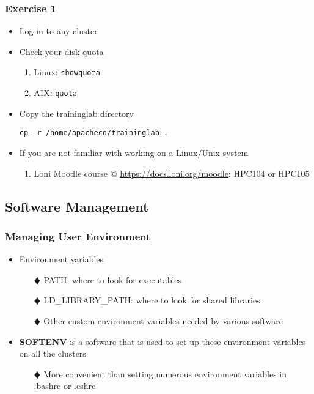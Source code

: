 \documentclass[slidestop,mathserif,compress,xcolor=svgnames,table]{beamer}
\newenvironment{ablock}[0]
{
\begin{beamerboxesrounded}[upper=uppercol,lower=lowercol,shadow=true]}
{\end{beamerboxesrounded}}
\newenvironment{eblock}[0]
{
\begin{beamerboxesrounded}[upper=uppercol2,lower=lowercol2,shadow=true]}
{\end{beamerboxesrounded}}
\begin{document}
\begin{frame}
  \frametitle{\small Exercise 1}
  \begin{eblock}{}
    \begin{itemize}
      \item Log in to any cluster
      \item Check your disk quota
      \begin{enumerate}
	\item Linux: \texttt{showquota}
	\item AIX: \texttt{quota}
      \end{enumerate}
      \item Copy the traininglab directory
      \item[] \texttt{cp -r /home/apacheco/traininglab .}
    \end{itemize}
  \end{eblock}

  \begin{ablock}{}
    \begin{itemize}
      \item If you are not familiar with working on a Linux/Unix system
      \begin{enumerate}
	\item Loni Moodle course @ \url{https://docs.loni.org/moodle}: HPC104 or HPC105
      \end{enumerate}
    \end{itemize}
  \end{ablock}
\end{frame}


\subsection{Software Management}
\begin{frame}
  \frametitle{\small Managing User Environment}
  \begin{itemize}
    \item Environment variables
    \begin{enumerate}
      \item[$\vardiamond$]PATH: where to look for executables
      \item[$\vardiamond$]LD\_LIBRARY\_PATH: where to look for shared libraries
      \item[$\vardiamond$]Other custom environment variables needed by various software
    \end{enumerate}
    \item {\bf SOFTENV} is a software that is used to set up these environment variables on all the clusters
    \begin{enumerate}
      \item[$\vardiamond$]More convenient than setting numerous environment variables in .bashrc or .cshrc
    \end{enumerate}
  \end{itemize}
\end{frame}
\end{document}
